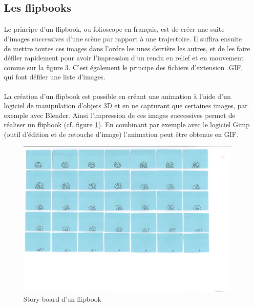 	
\subsection{Les flipbooks}

\paragraph{}
	Le principe d’un flipbook, ou folioscope en français, est de créer une suite d’images successives d’une scène par rapport à une trajectoire. Il suffira ensuite de mettre toutes ces images dans l’ordre les unes derrière les autres, et de les faire défiler rapidement pour avoir l’impression d’un rendu en relief et en mouvement comme sur la figure 3. C’est également le principe des fichiers d’extension .GIF, qui font défiler une liste d’images.

        
\paragraph{}
	La création d’un flipbook est possible en créant une animation à l’aide d’un logiciel de manipulation d’objets 3D et en ne capturant que certaines images, par exemple avec Blender. Ainsi l’impression de ces images successives permet de réaliser un flipbook (cf. figure \ref{fig:flipbook}). En combinant par exemple avec le logiciel Gimp (outil d’édition et de retouche d’image) l’animation peut être obtenue en GIF. 

\begin{figure}[h!]
		\centering
		\includegraphics[]{flipbook.png}
		\caption{\label{fig:flipbook} Story-board d’un flipbook \protect \footnotemark }
\end{figure}

